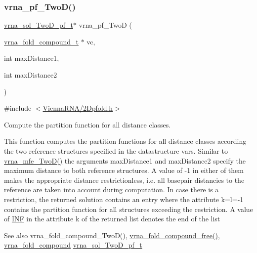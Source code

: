 \subsubsection{\texorpdfstring{vrna\_pf\_TwoD()}{vrna\_pf\_TwoD()}}
{\footnotesize\ttfamily \mbox{\hyperlink{group__kl__neighborhood__pf_structvrna__sol__TwoD__pf__t}{vrna\+\_\+sol\+\_\+\+Two\+D\+\_\+pf\+\_\+t}}$\ast$ vrna\+\_\+pf\+\_\+\+TwoD (\begin{DoxyParamCaption}\item[{\mbox{\hyperlink{group__fold__compound_ga1b0cef17fd40466cef5968eaeeff6166}{vrna\+\_\+fold\+\_\+compound\+\_\+t}} $\ast$}]{vc,  }\item[{int}]{max\+Distance1,  }\item[{int}]{max\+Distance2 }\end{DoxyParamCaption})}



{\ttfamily \#include $<$\mbox{\hyperlink{2Dpfold_8h}{Vienna\+R\+N\+A/2\+Dpfold.\+h}}$>$}



Compute the partition function for all distance classes. 

This function computes the partition functions for all distance classes according the two reference structures specified in the datastructure \textquotesingle{}vars\textquotesingle{}. Similar to \mbox{\hyperlink{group__kl__neighborhood__mfe_ga243c288b463147352829df04de6a2f77}{vrna\+\_\+mfe\+\_\+\+Two\+D()}} the arguments max\+Distance1 and max\+Distance2 specify the maximum distance to both reference structures. A value of \textquotesingle{}-\/1\textquotesingle{} in either of them makes the appropriate distance restrictionless, i.\+e. all basepair distancies to the reference are taken into account during computation. In case there is a restriction, the returned solution contains an entry where the attribute k=l=-\/1 contains the partition function for all structures exceeding the restriction. A value of \mbox{\hyperlink{constants_8h_a12c2040f25d8e3a7b9e1c2024c618cb6}{I\+NF}} in the attribute \textquotesingle{}k\textquotesingle{} of the returned list denotes the end of the list

\begin{DoxySeeAlso}{See also}
vrna\+\_\+fold\+\_\+compound\+\_\+\+Two\+D(), \mbox{\hyperlink{group__fold__compound_ga576a077b418a9c3650e06f8e5d296fc2}{vrna\+\_\+fold\+\_\+compound\+\_\+free()}}, \mbox{\hyperlink{group__fold__compound_ga6601d994ba32b11511b36f68b08403be}{vrna\+\_\+fold\+\_\+compound}} \mbox{\hyperlink{group__kl__neighborhood__pf_structvrna__sol__TwoD__pf__t}{vrna\+\_\+sol\+\_\+\+Two\+D\+\_\+pf\+\_\+t}}
\end{DoxySeeAlso}

